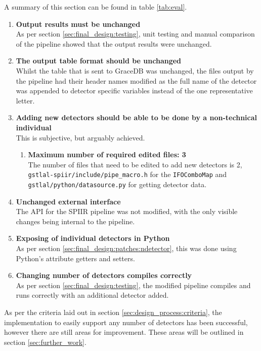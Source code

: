 \documentclass{article}
\begin{document}
A summary of this section can be found in table \ref{tab:eval}.

\begin{enumerate}
    \item \textbf{Output results must be unchanged} \\
        As per section \ref{sec:final_design:testing}, unit testing and manual comparison of the pipeline showed that the output results were unchanged.
    \item \textbf{The output table format should be unchanged} \\
        Whilst the table that is sent to GraceDB was unchanged, the files output by the pipeline had their header names modified as the full name of the detector was appended to detector specific variables instead of the one representative letter.
    \item \textbf{Adding new detectors should be able to be done by a non-technical individual} \\
        This is subjective, but arguably achieved.
        \begin{enumerate}
            \item \textbf{Maximum number of required edited files: 3} \\
                The number of files that need to be edited to add new detectors is 2, \texttt{gstlal-spiir/include/pipe\_macro.h} for the \texttt{IFOComboMap} and \texttt{gstlal/python/datasource.py} for getting detector data.
        \end{enumerate}
    \item \textbf{Unchanged external interface} \\
        The API for the SPIIR pipeline was not modified, with the only visible changes being internal to the pipeline.
    \item \textbf{Exposing of individual detectors in Python} \\
        As per section \ref{sec:final_design:patches:ndetector}, this was done using Python's attribute getters and setters.
    \item \textbf{Changing number of detectors compiles correctly} \\
        As per section \ref{sec:final_design:testing}, the modified pipeline compiles and runs correctly with an additional detector added.
\end{enumerate}

As per the criteria laid out in section \ref{sec:design_process:criteria}, the implementation to easily support any number of detectors has been successful, however there are still areas for improvement.
These areas will be outlined in section \ref{sec:further_work}.
\end{document}
